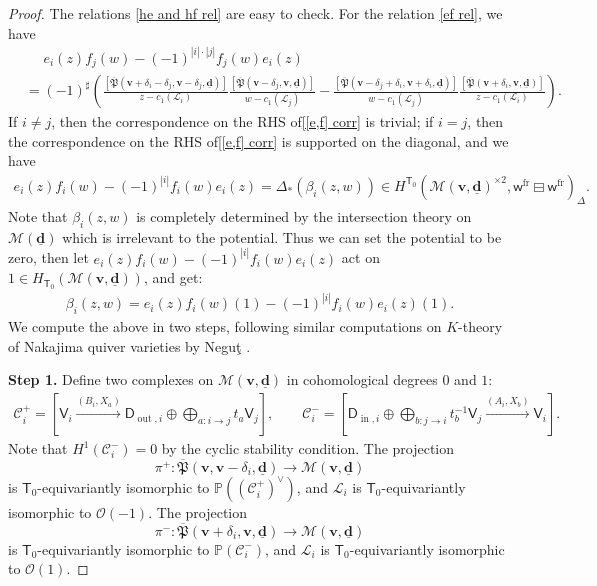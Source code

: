 \documentclass[10pt]{amsart}
\theoremstyle{definition}
\numberwithin{equation}{section}
\newcommand{\bP}{\mathbb{P}}
\newcommand{\bv}{\mathbf{v}}
\newcommand{\bd}{\mathbf{d}}
\newcommand{\cM}{\mathcal{M}}
\newcommand{\sT}{\mathsf{T}}
\newcommand{\sw}{\mathsf{w}}
\newcommand{\In}{\operatorname{in}}
\newcommand{\Out}{\operatorname{out}}
\begin{document}
\begin{proof}
The relations \eqref{he and hf rel} are easy to check. For the relation \eqref{ef rel}, we have
\begin{equation}\label{[e,f] corr}
\begin{split}
& \quad \,\, e_i(z)f_j(w)-(-1)^{|i|\cdot|j|}f_j(w)e_i(z)\\
    &=(-1)^{\sharp}\left(\frac{[\overline{\mathfrak{P}}(\bv+\delta_i-\delta_j,\bv-\delta_j,\underline{\bd})]}{z-c_1(\mathcal L_i)}\frac{[\overline{\mathfrak{P}}(\bv-\delta_j,\bv,\underline{\bd})]}{w-c_1(\mathcal L_j)}-\frac{[\overline{\mathfrak{P}}(\bv-\delta_j+\delta_i,\bv+\delta_i,\underline{\bd})]}{w-c_1(\mathcal L_j)}\frac{[\overline{\mathfrak{P}}(\bv+\delta_i,\bv,\underline{\bd})]}{z-c_1(\mathcal L_i)}\right).
\end{split}
\end{equation}
If $i\neq j$, then the correspondence on the RHS of\eqref{[e,f] corr} is trivial; if $i=j$, then the correspondence on the RHS of\eqref{[e,f] corr} is supported on the diagonal, and we have
\begin{align*}
    e_i(z)f_i(w)-(-1)^{|i|}f_i(w)e_i(z)=\Delta_*(\beta_i(z,w))\in H^{\sT_0}\left(\cM(\bv,\underline{\bd})^{\times 2},\sw^{\mathrm{fr}}\boxminus \sw^{\mathrm{fr}}\right)_{\Delta}.
\end{align*}
Note that $\beta_i(z,w)$ is completely determined by the intersection theory on $\cM(\underline{\bd})$ which is irrelevant to the potential. Thus we can set the potential to be zero, then let $e_i(z)f_i(w)-(-1)^{|i|}f_i(w)e_i(z)$ act on $1\in H_{\sT_0}(\cM(\bv,\underline{\bd}))$, and get:
\begin{align*}
    \beta_i(z,w)=e_i(z)f_i(w)(1)-(-1)^{|i|}f_i(w)e_i(z)(1).
\end{align*}
We compute the above in two steps, following similar computations on $K$-theory of Nakajima quiver varieties by Negu\c{t} \cite{N2}.

\textbf{Step 1.} Define two complexes on $\cM(\bv,\underline{\bd})$ in cohomological degrees $0$ and $1$:
\begin{align}\label{two complexes}
    \mathcal C^+_i=\left[\mathsf V_i\xrightarrow{(B_i, X_a)}\mathsf D_{\Out,i}\oplus\bigoplus_{a:i\to j}t_a\mathsf V_j\right],\qquad \mathcal C^-_i=\left[\mathsf D_{\In,i}\oplus\bigoplus_{b:j\to i}t_b^{-1}\mathsf V_j\xrightarrow{(A_i, X_b)}\mathsf V_i\right].
\end{align}
Note that $H^1(\mathcal C^-_i)=0$ by the cyclic stability condition. The projection 
$$\pi^+\colon \overline{\mathfrak{P}}(\bv,\bv-\delta_i,\underline{\bd})\to \cM(\bv,\underline{\bd})$$ is $\sT_0$-equivariantly isomorphic to $\bP((\mathcal C^+_i)^\vee)$, and $\mathcal L_i$ is $\sT_0$-equivariantly isomorphic to $\mathcal O(-1)$. The projection 
$$\pi^-\colon \overline{\mathfrak{P}}(\bv+\delta_i,\bv,\underline{\bd})\to \cM(\bv,\underline{\bd})$$ is $\sT_0$-equivariantly isomorphic to $\bP(\mathcal C^-_i)$, and $\mathcal L_i$ is $\sT_0$-equivariantly isomorphic to $\mathcal O(1)$. 


\end{proof}
\end{document}
